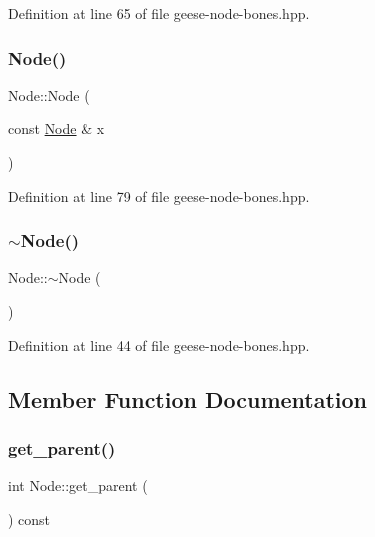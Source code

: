 Definition at line 65 of file geese-\/node-\/bones.\+hpp.

\mbox{\label{class_node_ac9e4a04860b442c2034e24aa058db129}} 
\subsubsection{\texorpdfstring{Node()}{Node()}\hspace{0.1cm}{\footnotesize\ttfamily [5/5]}}
{\footnotesize\ttfamily Node\+::\+Node (\begin{DoxyParamCaption}\item[{const \hyperlink{class_node}{Node} \&}]{x }\end{DoxyParamCaption})\hspace{0.3cm}{\ttfamily [inline]}}



Definition at line 79 of file geese-\/node-\/bones.\+hpp.

\mbox{\label{class_node_aa0840c3cb5c7159be6d992adecd2097c}} 
\subsubsection{\texorpdfstring{$\sim$\+Node()}{~Node()}}
{\footnotesize\ttfamily Node\+::$\sim$\+Node (\begin{DoxyParamCaption}{ }\end{DoxyParamCaption})\hspace{0.3cm}{\ttfamily [inline]}}



Definition at line 44 of file geese-\/node-\/bones.\+hpp.



\subsection{Member Function Documentation}
\mbox{\label{class_node_a661cb63a33e950b84c9c093c63d1ab63}} 
\subsubsection{\texorpdfstring{get\+\_\+parent()}{get\_parent()}}
{\footnotesize\ttfamily int Node\+::get\+\_\+parent (\begin{DoxyParamCaption}{ }\end{DoxyParamCaption}) const\hspace{0.3cm}{\ttfamily [inline]}}



